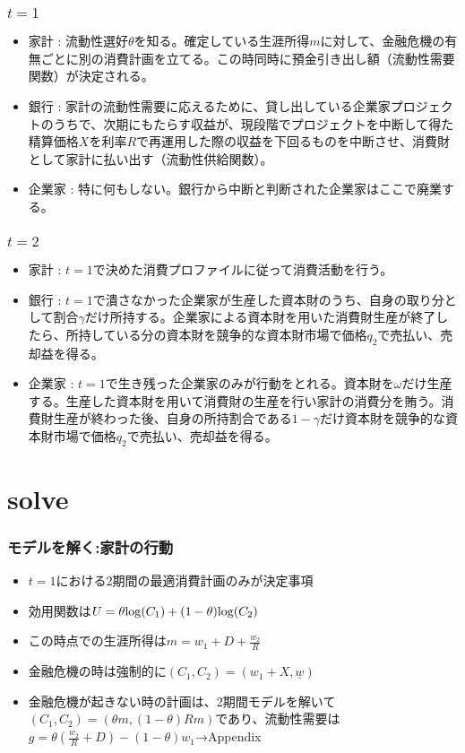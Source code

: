 \documentclass[dvipdfmx, 12pt]{beamer}
\begin{document}
\begin{frame}\frametitle{$t = 1$}
	\begin{itemize}
		\item 家計 : 流動性選好$\theta$を知る。確定している生涯所得$m$に対して、金融危機の有無ごとに別の消費計画を立てる。この時同時に預金引き出し額（流動性需要関数）が決定される。
		\item 銀行 : 家計の流動性需要に応えるために、貸し出している企業家プロジェクトのうちで、次期にもたらす収益が、現段階でプロジェクトを中断して得た精算価格$X$を利率$R$で再運用した際の収益を下回るものを中断させ、消費財として家計に払い出す（流動性供給関数）。
		\item 企業家 : 特に何もしない。銀行から中断と判断された企業家はここで廃業する。
	\end{itemize}
\end{frame}

\begin{frame}\frametitle{$t = 2$}
	\begin{itemize}
		\item 家計 : $t=1$で決めた消費プロファイルに従って消費活動を行う。
		\item 銀行 : $t = 1$で潰さなかった企業家が生産した資本財のうち、自身の取り分として割合$\gamma$だけ所持する。企業家による資本財を用いた消費財生産が終了したら、所持している分の資本財を競争的な資本財市場で価格$q_2$で売払い、売却益を得る。
		\item 企業家 : $t = 1$で生き残った企業家のみが行動をとれる。資本財を$\omega$だけ生産する。生産した資本財を用いて消費財の生産を行い家計の消費分を賄う。消費財生産が終わった後、自身の所持割合である$1-\gamma$だけ資本財を競争的な資本財市場で価格$q_2$で売払い、売却益を得る。
	\end{itemize}
\end{frame}

\section{solve}
\begin{frame}\frametitle{モデルを解く:家計の行動}
	\begin{itemize}
		\item $t = 1$における2期間の最適消費計画のみが決定事項
		\item 効用関数は$U = \theta {\rm log}(C_1) + (1 - \theta){\rm log}(C_2)$
		\item この時点での生涯所得は$m = w_1 + D + \frac{w_2}{R}$
		\item 金融危機の時は強制的に$(C_1, C_2) = (w_1+X, \underline{w})$
		\item 金融危機が起きない時の計画は、2期間モデルを解いて$(C_1, C_2) = (\theta m, (1-\theta)Rm)$であり、流動性需要は$g = \theta \left( \frac{w_2}{R} + D\right) - (1-\theta)w_1$→Appendix
	\end{itemize}
\end{frame}
\end{document}
